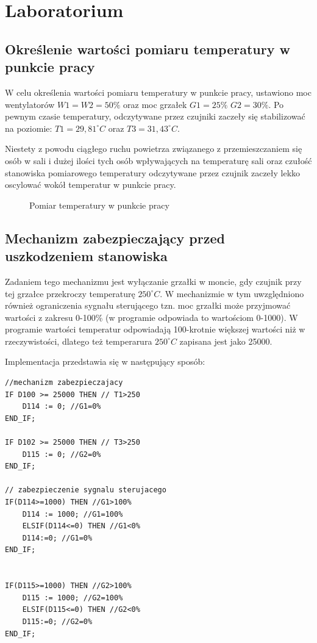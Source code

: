 \chapter{Laboratorium}

\section{Określenie wartości pomiaru temperatury w punkcie pracy}

W celu określenia wartości pomiaru temperatury w punkcie pracy, ustawiono moc wentylatorów  $W1 = W2 = 50\%$ oraz moc grzałek $G1 = 25\%$  $G2 = 30\%$.
Po pewnym czasie temperatury, odczytywane przez czujniki zaczeły się stabilizować  na poziomie:  $T1 = 29,81^{\circ} C$ oraz $T3 = 31,43^{\circ} C$.


Niestety z powodu ciągłego ruchu powietrza związanego z przemieszczaniem się osób w sali i dużej ilości tych osób wpływających na temperaturę sali oraz czułość stanowiska pomiarowego temperatury odczytywane przez czujnik zaczeły lekko oscylować wokół temperatur w punkcie pracy.

\begin{figure}[H]
\centering

\caption{Pomiar temperatury w punkcie pracy}
\end{figure}

\section{Mechanizm zabezpieczający przed uszkodzeniem stanowiska}

Zadaniem tego mechanizmu jest wyłączanie grzałki w moncie, gdy czujnik przy tej grzałce przekroczy temperaturę $250^{\circ} C$. 
W mechanizmie w tym uwzględniono również ograniczenia sygnału sterującego tzn. moc grzałki może przyjmować wartości z zakresu 0-100\% (w programie odpowiada to wartościom 0-1000). W programie wartości temperatur odpowiadają 100-krotnie większej wartości niż w rzeczywistości, dlatego też temperarura $250^{\circ} C$ zapisana jest jako 25000.

Implementacja przedstawia się w następujący sposób:



\begin{lstlisting}[style=customc,frame=single, caption=Mechanizm zabezpieczający , label=lst:overheat_lock] 
//mechanizm zabezpieczajacy
IF D100 >= 25000 THEN // T1>250  
	D114 := 0; //G1=0%
END_IF;

IF D102 >= 25000 THEN // T3>250 
	D115 := 0; //G2=0%
END_IF;

// zabezpieczenie sygnalu sterujacego
IF(D114>=1000) THEN //G1>100%
	D114 := 1000; //G1=100%
	ELSIF(D114<=0) THEN //G1<0%
	D114:=0; //G1=0%
END_IF;


IF(D115>=1000) THEN //G2>100%
	D115 := 1000; //G2=100%
	ELSIF(D115<=0) THEN //G2<0%
	D115:=0; //G2=0%
END_IF;
\end{lstlisting}



